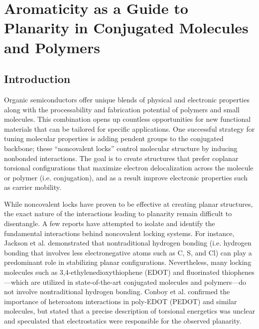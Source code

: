 \chapter{Aromaticity as a Guide to Planarity in Conjugated Molecules and Polymers}

\section{Introduction}

Organic semiconductors offer unique blends of physical and electronic properties along with the processability and fabrication potential of polymers and small molecules.\cite{Kuei2017, Swager2017} This combination opens up countless opportunities for new functional materials that can be tailored for specific applications.\cite{Mei2013, Muench2016, Someya2016, VanDeBurgt2018} One successful strategy for tuning molecular properties is adding pendent groups to the conjugated backbone; these ``noncovalent locks'' control molecular structure by inducing nonbonded interactions.\cite{Jackson2013, Cheng2016, Conboy2016, Huang2017}
The goal is to create structures that prefer coplanar torsional configurations that maximize electron delocalization across the molecule or polymer (i.e. conjugation), and as a result improve electronic properties such as carrier mobility.

While noncovalent locks have proven to be effective at creating planar structures, the exact nature of the interactions leading to planarity remain difficult to disentangle. A few reports have attempted to isolate and identify the fundamental interactions behind  noncovalent locking systems. For instance, Jackson et al. demonstrated that nontraditional hydrogen bonding (i.e. hydrogen bonding that involves less electronegative atoms such as C, S, and Cl) can play a predominant role in stabilizing planar configurations.\cite{Jackson2013} Nevertheless, many locking molecules such as 3,4-ethylenedioxythiophene (EDOT) and fluorinated thiophenes---which are utilized in state-of-the-art conjugated molecules and polymers\cite{Yum2014, Granstrom1995, Wijsboom2011, Gao2015, Gao2018, Jo2014, Li2015}---do not involve nontraditional hydrogen bonding. Conboy et al. confirmed the importance of heteroatom interactions in poly-EDOT (PEDOT) and similar molecules, but stated that a precise description of torsional energetics was unclear and speculated that electrostatics were responsible for the observed planarity.\cite{Conboy2016}

